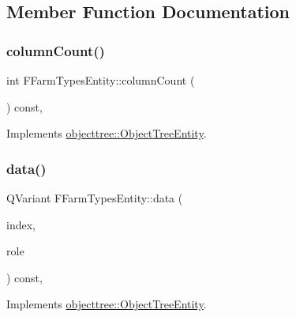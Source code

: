 \subsection{Member Function Documentation}
\mbox{\label{classobjecttree_1_1_f_farm_types_entity_a755bc0ac305b52156994c0ce92e7d5fe}} 
\subsubsection{\texorpdfstring{columnCount()}{columnCount()}}
{\footnotesize\ttfamily int F\+Farm\+Types\+Entity\+::column\+Count (\begin{DoxyParamCaption}{ }\end{DoxyParamCaption}) const\hspace{0.3cm}{\ttfamily [override]}, {\ttfamily [virtual]}}



Implements \mbox{\hyperlink{classobjecttree_1_1_object_tree_entity_a70fd25eccf88b305e9db15fbe3daeae8}{objecttree\+::\+Object\+Tree\+Entity}}.

\mbox{\label{classobjecttree_1_1_f_farm_types_entity_a3c5fcc80d3a08041d5f9e758f7595d5f}} 
\subsubsection{\texorpdfstring{data()}{data()}}
{\footnotesize\ttfamily Q\+Variant F\+Farm\+Types\+Entity\+::data (\begin{DoxyParamCaption}\item[{const Q\+Model\+Index \&}]{index,  }\item[{int}]{role }\end{DoxyParamCaption}) const\hspace{0.3cm}{\ttfamily [override]}, {\ttfamily [virtual]}}



Implements \mbox{\hyperlink{classobjecttree_1_1_object_tree_entity_a2413c6573de18b451d97eb3800f10f35}{objecttree\+::\+Object\+Tree\+Entity}}.

